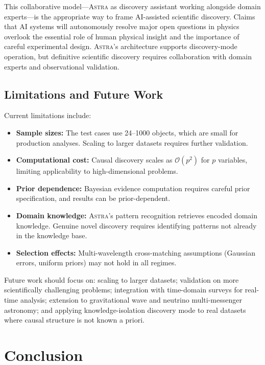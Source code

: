 \documentclass[fleqn,usenatbib]{mnras}
\newcommand{\astra}{\textsc{Astra}\xspace}
\begin{document}
This collaborative model---\astra as discovery assistant working alongside domain experts---is the appropriate way to frame AI-assisted scientific discovery.
Claims that AI systems will autonomously resolve major open questions in physics overlook the essential role of human physical insight and the importance of careful experimental design.
\astra's architecture supports discovery-mode operation, but definitive scientific discovery requires collaboration with domain experts and observational validation.

\subsection{Limitations and Future Work}
\label{sec:discussion:limitations}

Current limitations include:
\begin{itemize}
  \item \textbf{Sample sizes:} The test cases use 24--1000 objects, which are small for production analyses. Scaling to larger datasets requires further validation.
  \item \textbf{Computational cost:} Causal discovery scales as $\mathcal{O}(p^2)$ for $p$ variables, limiting applicability to high-dimensional problems.
  \item \textbf{Prior dependence:} Bayesian evidence computation requires careful prior specification, and results can be prior-dependent.
  \item \textbf{Domain knowledge:} \astra's pattern recognition retrieves encoded domain knowledge. Genuine novel discovery requires identifying patterns not already in the knowledge base.
  \item \textbf{Selection effects:} Multi-wavelength cross-matching assumptions (Gaussian errors, uniform priors) may not hold in all regimes.
\end{itemize}

Future work should focus on: scaling to larger datasets; validation on more scientifically challenging problems; integration with time-domain surveys for real-time analysis; extension to gravitational wave and neutrino multi-messenger astronomy; and applying knowledge-isolation discovery mode to real datasets where causal structure is not known a priori.

\section{Conclusion}
\label{sec:conclusion}
\end{document}
